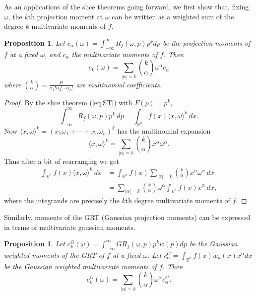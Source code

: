 \documentclass{amsart}
\newtheorem{proposition}[theorem]{Proposition}
\theoremstyle{remark}
\numberwithin{equation}{section}
\newcommand{\RR}{\mathbb{R}}
\begin{document}
As an applications of the slice theorems going forward, we first show that, fixing $\omega$, the $k$th projection moment at $\omega$ can be written as a weighted sum of the degree $k$ multivariate moments of $f$. 
\begin{proposition}
    Let $c_\alpha (\omega) = \int_{-\infty}^\infty R_f(\omega, p) p^k dp$ be the projection moments of $f$ at a fixed $\omega$, and $c_\alpha$ the multivariate moments of $f$. Then
    \[
        c_k(\omega) = \sum_{|\alpha| = k}\binom{k}{\alpha} \omega^\alpha c_\alpha
    \]
    where $\binom{k}{\alpha} = \frac{k!}{\alpha_1! \alpha_2! \cdots \alpha_n!}$ are multinomial coefficients.
\end{proposition}
\begin{proof}
By the slice theorem (\ref{eq:ST}) with $F(p) = p^k$,
\[
    \int_{-\infty}^\infty R_f(\omega, p) p^k ~dp 
    = \int_{\RR^n} f(x) \langle x, \omega \rangle^k ~dx.
\]
Now $\langle x, \omega \rangle^k = (x_1 \omega_1 + \cdots + x_n \omega_n)^k$ has the multinomial expansion
\[
    \langle x, \omega \rangle^k = \sum_{|\alpha| = k}\binom{k}{\alpha} x^\alpha\omega^\alpha.
\]
Thus after a bit of rearranging we get
\begin{align*}
    \int_{\RR^n} f(x) \langle x, \omega \rangle^k ~dx
    &= \int_{\RR^n} f(x) \sum_{|\alpha| = k}\binom{k}{\alpha} x^\alpha \omega^\alpha ~dx \\
    &= \sum_{|\alpha| = k}\binom{k}{\alpha} \omega^\alpha \int_{\RR^n} f(x) x^\alpha ~dx,
\end{align*}
where the integrands are precisely the $k$th degree multivariate moments of $f$.
\end{proof}
Similarly, moments of the GRT (Gaussian projection moments) can be expressed in terms of multivariate gaussian moments.
\begin{proposition}
Let $c_k^G(\omega) = \int_{-\infty}^\infty GR_f(\omega, p) p^k w(p) dp$ be the Gaussian weighted moments of the GRT of $f$ at a fixed $\omega$. Let $c^G_\alpha = \int_{\RR^n} f(x) w_n(x) x^\alpha dx$ be the Gaussian weighted multivariate moments of $f$. Then
\[
    c^G_k(\omega) = \sum_{|\alpha| = k}\binom{k}{\alpha} \omega^\alpha c^G_\alpha.
\]
\end{proposition}
\end{document}
